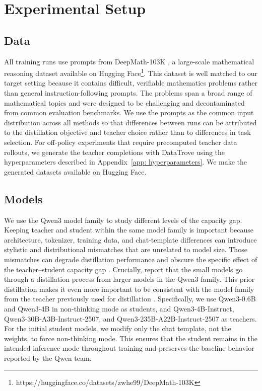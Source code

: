 \chapter{Experimental Setup}

\section{Data}

All training runs use prompts from DeepMath-103K \cite{he2025DeepMath103KLargeScaleChallenging}, a large-scale mathematical reasoning dataset available on Hugging Face\footnote{https://huggingface.co/datasets/zwhe99/DeepMath-103K}. This dataset is well matched to our target setting because it contains difficult, verifiable mathematics problems rather than general instruction-following prompts. The problems span a broad range of mathematical topics and were designed to be challenging and decontaminated from common evaluation benchmarks. We use the prompts as the common input distribution across all methods so that differences between runs can be attributed to the distillation objective and teacher choice rather than to differences in task selection.
For off-policy experiments that require precomputed teacher data rollouts, we generate the teacher completions with DataTrove \cite{penedo2024datatrove} using the hyperparameters described in Appendix~\ref{app: hyperparameters}. We make the generated datasets available on Hugging Face.

\section{Models}

We use the Qwen3 model family \cite{yangQwen3TechnicalReport2025} to study different levels of the capacity gap. Keeping teacher and student within the same model family is important because architecture, tokenizer, training data, and chat-template differences can introduce stylistic and distributional mismatches that are unrelated to model size. Those mismatches can degrade distillation performance and obscure the specific effect of the teacher--student capacity gap \cite{liRethinkingOnPolicyDistillation2026}. Crucially, \cite{yangQwen3TechnicalReport2025} report that the small models go through a distillation process from larger models in the Qwen3 family. This prior distillation makes it even more important to be consistent with the model family from the teacher previously used for distillation \cite{wuLightningOPDEfficient2026}.
Specifically, we use Qwen3-0.6B and Qwen3-4B in non-thinking mode as students, and Qwen3-4B-Instruct, Qwen3-30B-A3B-Instruct-2507, and Qwen3-235B-A22B-Instruct-2507 as teachers. For the initial student models, we modify only the chat template, not the weights, to force non-thinking mode. This ensures that the student remains in the intended inference mode throughout training and preserves the baseline behavior reported by the Qwen team.

